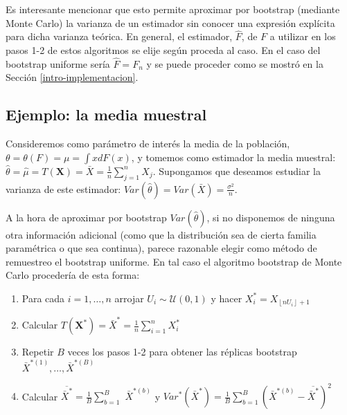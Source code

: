 \documentclass[
]{book}
\theoremstyle{break}
\theoremstyle{definition}
\theoremstyle{definition}
\theoremstyle{definition}
\theoremstyle{definition}
\theoremstyle{remark}
\begin{document}
Es interesante mencionar que esto permite aproximar por bootstrap
(mediante Monte Carlo) la varianza de un estimador sin conocer una
expresión explícita para dicha varianza teórica.
En general, el estimador, \(\hat{F}\), de \(F\) a utilizar en los pasos 1-2
de estos algoritmos se elije según proceda al caso. En el caso del
bootstrap uniforme sería \(\hat{F}=F_n\) y se puede proceder
como se mostró en la Sección \ref{intro-implementacion}.

\hypertarget{ejemplo-la-media-muestral}{%
\subsection{Ejemplo: la media muestral}\label{ejemplo-la-media-muestral}}

Consideremos como parámetro de interés la media de la población,
\(\theta =\theta \left( F \right) =\mu =\int xdF\left( x \right)\), y
tomemos como estimador la media muestral:
\(\hat{\theta}=\hat{\mu}=T\left( \mathbf{X} \right) =\bar{X}=\frac{1}{n}\sum_{j=1}^{n}X_j\).
Supongamos que deseamos estudiar la varianza de este estimador:
\(Var\left( \hat{\theta} \right) =Var\left( \bar{X} \right) =\frac{\sigma^2}{n}\).

A la hora de aproximar por bootstrap \(Var\left( \hat{\theta} \right)\),
si no disponemos de ninguna otra información adicional (como que la
distribución sea de cierta familia paramétrica o que sea continua),
parece razonable elegir como método de remuestreo el bootstrap uniforme.
En tal caso el algoritmo bootstrap de Monte Carlo procedería de esta
forma:

\begin{enumerate}
\def\labelenumi{\arabic{enumi}.}
\item
  Para cada \(i=1,\ldots ,n\) arrojar \(U_i\sim \mathcal{U}\left( 0,1 \right)\) y
  hacer \(X_i^{\ast}=X_{\left\lfloor nU_i\right\rfloor +1}\)
\item
  Calcular
  \(T\left( \mathbf{X}^{\ast} \right) =\bar{X}^{\ast}= \frac{1}{n}\sum_{i=1}^{n}X_i^{\ast}\)
\item
  Repetir \(B\) veces los pasos 1-2 para obtener las réplicas bootstrap
  \(\bar{X}^{\ast (1)}, \ldots, \bar{X}^{\ast (B)}\)
\item
  Calcular \(\overline{\bar{X}^{\ast}}=\frac{1}{B}\sum_{b=1}^{B}\)
  \(\bar{X}^{\ast (b)}\) y
  \(Var^{\ast}\left( \bar{X}^{\ast} \right) =\frac{1}{B} \sum_{b=1}^{B}\left( \bar{X}^{\ast (b)}-\overline{\bar{X}^{\ast}} \right)^2\)
\end{enumerate}
\end{document}
